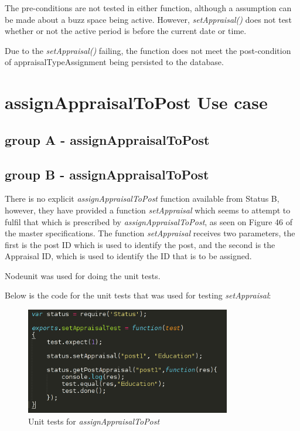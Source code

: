 \documentclass[a4paper,12pt]{article}
\begin{document}
The pre-conditions are not tested in either function, although a assumption can be made about a buzz space being active. However, \textit{setAppraisal()} does not test whether or not the active period is before the current date or time.

Due to the \textit{setAppraisal()} failing, the function does not meet the post-condition of appraisalTypeAssignment being persisted to the database.

\newpage
\section{assignAppraisalToPost Use case}
\subsection{group A - assignAppraisalToPost}

\subsection{group B - assignAppraisalToPost}
There is no explicit \textit{assignAppraisalToPost} function available from Status B, however, they have provided a function \textit{setAppraisal} which seems to attempt to fulfil that which is prescribed by \textit{assignAppraisalToPost}, as seen on Figure 46 of the master specifications.
The function \textit{setAppraisal} receives two parameters, the first is the post ID which is used to identify the post, and the second is the Appraisal ID, which is used to identify the ID that is to be assigned.

Nodeunit was used for doing the unit tests.

Below is the code for the unit tests that was used for testing \textit{setAppraisal}:

	\begin{figure}[H]
		\centering
		\includegraphics[width=0.8\textwidth]{Figures/assignAppraisalToPost_unittest.png}
		\caption{Unit tests for \textit{assignAppraisalToPost}}
	\end{figure}
	
\end{document}
